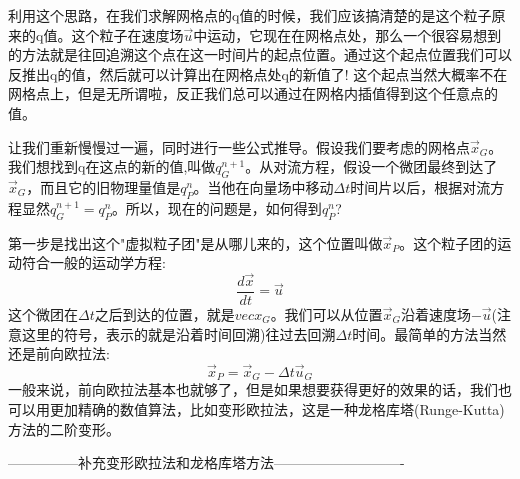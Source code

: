 \documentclass{article}
\begin{document}
\par
利用这个思路，在我们求解网格点的q值的时候，我们应该搞清楚的是这个粒子原来的q值。这个粒子在速度场$\vec{u}$中运动，它现在在网格点处，那么一个很容易想到的方法就是往回追溯这个点在这一时间片的起点位置。通过这个起点位置我们可以反推出q的值，然后就可以计算出在网格点处q的新值了! 这个起点当然大概率不在网格点上，但是无所谓啦，反正我们总可以通过在网格内插值得到这个任意点的值。
\par
让我们重新慢慢过一遍，同时进行一些公式推导。假设我们要考虑的网格点$\vec{x}_G$。我们想找到q在这点的新的值,叫做$q^{n+1}_G$。从对流方程，假设一个微团最终到达了$\vec{x}_G$，而且它的旧物理量值是$q_P^n$。当他在向量场中移动$\Delta{t}$时间片以后，根据对流方程显然$q_G^{n+1}=q_P^n$。所以，现在的问题是，如何得到$q_P^n$?
\par
第一步是找出这个"虚拟粒子团"是从哪儿来的，这个位置叫做$\vec{x}_P$。这个粒子团的运动符合一般的运动学方程:
\begin{equation}
\frac{d\vec{x}}{dt}=\vec{u}
\end{equation}
这个微团在$\Delta{t}$之后到达的位置，就是$vec{x}_G$。我们可以从位置$\vec{x}_G$沿着速度场$-\vec{u}$(注意这里的符号，表示的就是沿着时间回溯)往过去回溯$\Delta{t}$时间。最简单的方法当然还是前向欧拉法:
\begin{equation}
\vec{x}_P=\vec{x}_G-\Delta{t}\vec{u}_G
\end{equation}
一般来说，前向欧拉法基本也就够了，但是如果想要获得更好的效果的话，我们也可以用更加精确的数值算法，比如变形欧拉法，这是一种龙格库塔(Runge-Kutta)方法的二阶变形。

---------------补充变形欧拉法和龙格库塔方法----------------------------
\end{document}
